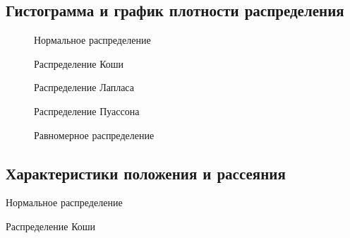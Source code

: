 \subsection{Гистограмма и график плотности распределения}
	\begin{figure}[h]
		\caption{Нормальное распределение}
		\label{ris:image}
	\end{figure}
	
	\begin{figure}[h]
		\caption{Распределение Коши}
		\label{ris:image}
	\end{figure}

	\begin{figure}[h]
		\caption{Распределение Лапласа}
		\label{ris:image}
	\end{figure}

	\begin{figure}[h]
		\caption{Распределение Пуассона}
		\label{ris:image}
	\end{figure}

	\begin{figure}[h]
		\caption{Равномерное распределение}
		\label{ris:image}
	\end{figure}

\subsection{Характеристики положения и рассеяния}
	\begin{table}[H]
		\label{tabular:timesandtenses}
		\begin{center}
			
		\end{center}
		\caption{Нормальное распределение}
	\end{table}
	
	\begin{table}[H]
		\label{tabular:timesandtenses}
		\begin{center}
			
		\end{center}
		\caption{Распределение Коши}
	\end{table}

